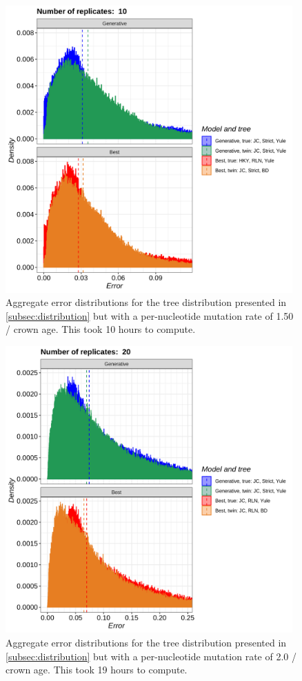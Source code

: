 \begin{figure}[H]
  \includegraphics[width=0.98\textwidth]{pirouette_example_39/errors.png}
  \caption{Aggregate error distributions for the tree distribution presented in \ref{subsec:distribution} but with a per-nucleotide mutation rate of 1.50 / crown age. This took 10 hours to compute.}
\end{figure}

\begin{figure}[H]
  \includegraphics[width=0.98\textwidth]{pirouette_example_40/errors.png}
  \caption{Aggregate error distributions for the tree distribution presented in \ref{subsec:distribution} but with a per-nucleotide mutation rate of 2.0 / crown age. This took 19 hours to compute.}
\end{figure}


